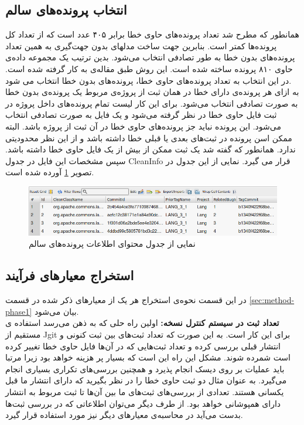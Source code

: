 \subsection{انتخاب پرونده‌های سالم}
همانطور که مطرح شد تعداد پرونده‌های حاوی خطا برابر ۴۰۵ عدد است که از تعداد کل پرونده‌ها کمتر است. بنابرین جهت ساخت مدلهای بدون جهت‌گیری به همین تعداد پرونده‌های بدون خطا به طور تصادفی انتخاب می‌شود. بدین ترتیب یک مجموعه داده‌ی  حاوی ۸۱۰ پرونده ساخته شده است. این روش طبق مقاله‌ی \cite{johannessen2008data} به کار گرفته شده است. در این انتخاب به تعداد پرونده‌های حاوی خطا، پرونده‌های بدون خطا انتخاب می شود. \\به ازای هر پرونده‌ی دارای خطا در همان ثبت از پروژه‌ی مربوط یک پرونده‌ی بدون خطا به صورت تصادفی انتخاب می‌شود. برای این کار لیست تمام پرونده‌های داخل پروژه در ثبت فایل حاوی خطا در نظر گرفته می‌شود و یک فایل به صورت تصادفی انتخاب می‌شود. این پرونده نباید جز پرونده‌های حاوی خطا در آن ثبت از  پروژه باشد.  البته ممکن اسن پرونده در ثبت‌های بعدی یا قبلی خطا داشته باشد و از این نظر محدودیتی ندارد. همانطور که گفته شد یک ثبت ممکن از بیش از یک فایل حاوی خطا داشته باشد. سپس مشخصات این فایل در جدول CleanInfo قرار می گیرد. نمایی از این جدول در تصویر \ref{fig:clean-info} آورده شده است.
\begin{figure}[H]
	\centering
	\includegraphics[width=1\textwidth]{img/case_study/clean-info.png}
	\caption{نمایی از جدول محتوای اطلاعات پرونده‌های سالم}
	\label{fig:clean-info}
\end{figure}



\subsection{ استخراج معیارهای فرآیند}
در  این قسمت نحوه‌ی استخراج هر یک از معیارهای ذکر شده در قسمت \ref{sec:method-phase1} بیان می‌شود. \\
\textbf{‫تعداد ثبت در سیستم کنترل نسخه‬:}
اولین راه حلی که به ذهن می‌رسد استفاده ی مستقیم از Jgit برای این کار است.  به این صورت که تعداد ثبت‌های بین ثبت کنونی و انتشار قبلی  بررسی کرده و تعداد  ثبت‌هایی که در آن‌ها فایل حاوی خطا تغییر کرده است شمرده شوند. مشکل این راه این است که بسیار پر هزینه  خواهد بود زیرا مرتبا باید عملیات  بر روی دیسک انجام پذیرد و همچنین بررسی‌های تکراری بسیاری انجام می‌گیرد. به عنوان مثال دو ثبت حاوی خطا را در نظر بگیرید که دارای انتشار ما قبل یکسانی هستند. تعدادی از بررسی‌های ثبت‌های ما بین آن‌ها تا ثبت مربوط به انتشار دارای همپوشانی خواهد بود. از طرف دیگر می‌توان اطلاعاتی که در بررسی ثبت‌ها بدست می‌آید در محاسبه‌ی معیارهای دیگر نیز مورد استفاده قرار گیرد.\\

